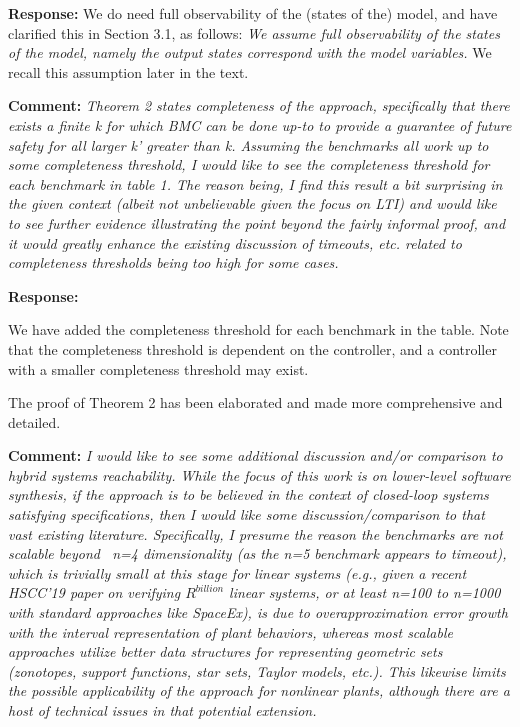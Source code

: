 \documentclass{article}
\begin{document}
\vspace{1em}
{\bf Response: }
We do need full observability of the (states of the) model, and have clarified this in Section 3.1, as follows: {\it We assume full observability of the states of the model, namely the output states correspond with the model variables.  } We recall this assumption later in the text. 

\vspace{2em}
{\bf Comment: } {\itshape Theorem 2 states completeness of the approach, specifically that there exists a finite k for which BMC can be done up-to to
provide a guarantee of future safety for all larger k' greater than k. Assuming the benchmarks all work up to some completeness threshold, I would like to see
the completeness threshold for each benchmark in table 1. The reason being, I find this result a bit surprising in the given context (albeit not
unbelievable given the focus on LTI) and would like to see further evidence illustrating the point beyond the fairly informal proof, and it would
greatly enhance the existing discussion of timeouts, etc. related to completeness thresholds being too high for some cases.}

\vspace{1em}

{\bf Response: }

We have added the completeness threshold for each benchmark in the table. Note that the completeness threshold is dependent on the controller, 
and a controller with a smaller completeness threshold may exist. 

The proof of Theorem 2 has been elaborated and made more comprehensive and detailed. 


\vspace{2em}

{\bf Comment: }
{\itshape I would like to see some additional discussion and/or comparison to hybrid systems reachability. While the focus of this work is on lower-level
software synthesis, if the approach is to be believed in the context of closed-loop systems satisfying specifications, then I would like some
discussion/comparison to that vast existing literature. Specifically, I presume the reason the benchmarks are not scalable beyond ~n=4 dimensionality
(as the n=5 benchmark appears to timeout), which is trivially small at this stage for linear systems (e.g., given a recent HSCC'19 paper on verifying
$R^{billion}$ linear systems, or at least n=100 to n=1000 with standard approaches like SpaceEx), is due to overapproximation error growth with the
interval representation of plant behaviors, whereas most scalable approaches utilize better data structures for representing geometric sets
(zonotopes, support functions, star sets, Taylor models, etc.). This likewise limits the possible applicability of the
approach for nonlinear plants, although there are a host of technical issues in that potential extension. }
\end{document}
